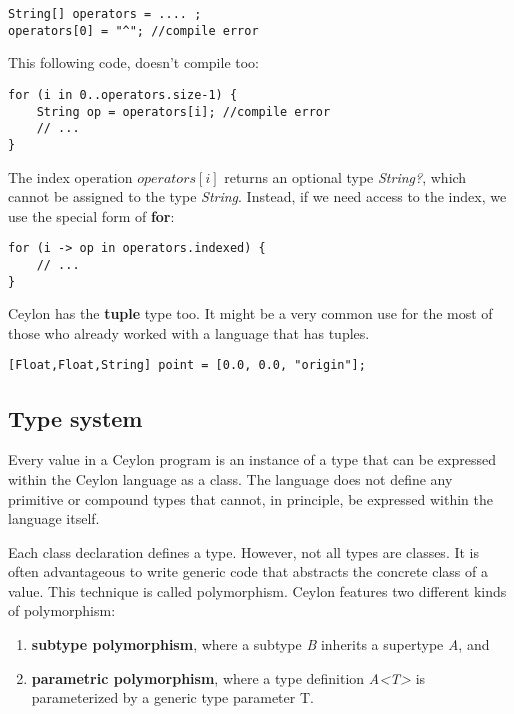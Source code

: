 \begin{lstlisting}[label=cpc,caption=Ceylon Producer-Consumer example]
String[] operators = .... ;
operators[0] = "^"; //compile error
\end{lstlisting}

This following code, doesn't compile too:

\begin{lstlisting}[label=cpc,caption=Ceylon Producer-Consumer example]
for (i in 0..operators.size-1) {
    String op = operators[i]; //compile error
    // ...
}
\end{lstlisting}

The index operation $operators[i]$ returns an optional type \textit{String?},
which cannot be assigned to the type \textit{String}. Instead, if we need access
to the index, we use the special form of \textbf{for}:

\begin{lstlisting}[label=cpc,caption=Ceylon Producer-Consumer example]
for (i -> op in operators.indexed) {
    // ...
}
\end{lstlisting}

Ceylon has the \textbf{tuple} type too. It might be a very common use for the
most of those who already worked with a language that has tuples.

\begin{lstlisting}[label=cpc,caption=Ceylon Producer-Consumer example]
[Float,Float,String] point = [0.0, 0.0, "origin"];
\end{lstlisting}

\subsection{Type system}

Every value in a Ceylon program is an instance of a type that can be expressed
within the Ceylon language as a class. The language does not define any
primitive or compound types that cannot, in principle, be expressed within the
language itself.

Each class declaration defines a type. However, not all types are classes. It is
often advantageous to write generic code that abstracts the concrete class of a
value. This technique is called polymorphism. Ceylon features two different
kinds of polymorphism:

\begin{enumerate}
	\item \textbf{subtype polymorphism}, where a subtype \textit{B} inherits a supertype \textit{A}, and 
	\item \textbf{parametric polymorphism}, where a type definition \textit{A<T>} is parameterized by a generic type parameter T.
\end{enumerate}

